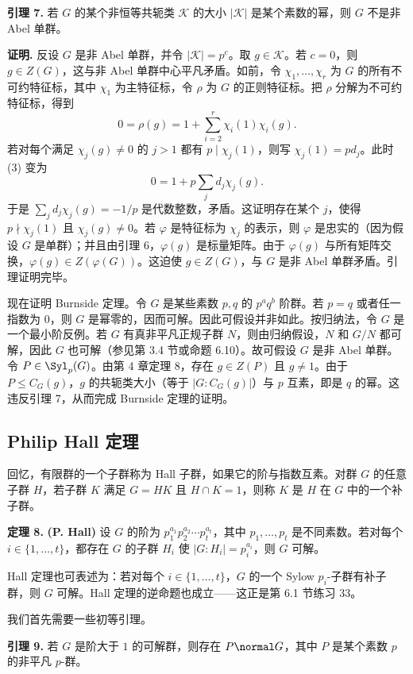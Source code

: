 \noindent\textbf{引理 7.} 若 $G$ 的某个非恒等共轭类 $\mathcal K$ 的大小 $|\mathcal K|$ 是某个素数的幂，则 $G$ 不是非 Abel 单群。

\noindent\textbf{证明.} 反设 $G$ 是非 Abel 单群，并令 $|\mathcal K|=p^c$。取 $g\in\mathcal K$。若 $c=0$，则 $g\in Z(G)$，这与非 Abel 单群中心平凡矛盾。如前，令 $\chi_1,\ldots,\chi_r$ 为 $G$ 的所有不可约特征标，其中 $\chi_1$ 为主特征标，令 $\rho$ 为 $G$ 的正则特征标。把 $\rho$ 分解为不可约特征标，得到
\[
  0=\rho(g)=1+\sum_{i=2}^r \chi_i(1)\chi_i(g). \tag{19.3}
\]
若对每个满足 $\chi_j(g)\neq0$ 的 $j>1$ 都有 $p\mid\chi_j(1)$，则写 $\chi_j(1)=pd_j$。此时 (3) 变为
\[
  0=1+p\sum_j d_j\chi_j(g).
\]
于是 $\sum_j d_j\chi_j(g)=-1/p$ 是代数整数，矛盾。这证明存在某个 $j$，使得 $p\nmid\chi_j(1)$ 且 $\chi_j(g)\neq0$。若 $\varphi$ 是特征标为 $\chi_j$ 的表示，则 $\varphi$ 是忠实的（因为假设 $G$ 是单群）；并且由引理 6，$\varphi(g)$ 是标量矩阵。由于 $\varphi(g)$ 与所有矩阵交换，$\varphi(g)\in Z(\varphi(G))$。这迫使 $g\in Z(G)$，与 $G$ 是非 Abel 单群矛盾。引理证明完毕。

现在证明 Burnside 定理。令 $G$ 是某些素数 $p,q$ 的 $p^a q^b$ 阶群。若 $p=q$ 或者任一指数为 $0$，则 $G$ 是幂零的，因而可解。因此可假设并非如此。按归纳法，令 $G$ 是一个最小阶反例。若 $G$ 有真非平凡正规子群 $N$，则由归纳假设，$N$ 和 $G/N$ 都可解，因此 $G$ 也可解（参见第 3.4 节或命题 6.10）。故可假设 $G$ 是非 Abel 单群。令 $P\in\Syl_p(G)$。由第 4 章定理 8，存在 $g\in Z(P)$ 且 $g\neq1$。由于 $P\leq C_G(g)$，$g$ 的共轭类大小（等于 $|G:C_G(g)|$）与 $p$ 互素，即是 $q$ 的幂。这违反引理 7，从而完成 Burnside 定理的证明。

\subsection*{Philip Hall 定理}

回忆，有限群的一个子群称为 Hall 子群，如果它的阶与指数互素。对群 $G$ 的任意子群 $H$，若子群 $K$ 满足 $G=HK$ 且 $H\cap K=1$，则称 $K$ 是 $H$ 在 $G$ 中的一个补子群。

\noindent\textbf{定理 8.} \textbf{(P. Hall)} 设 $G$ 的阶为 $p_1^{a_1}p_2^{a_2}\cdots p_t^{a_t}$，其中 $p_1,\ldots,p_t$ 是不同素数。若对每个 $i\in\{1,\ldots,t\}$，都存在 $G$ 的子群 $H_i$ 使 $|G:H_i|=p_i^{a_i}$，则 $G$ 可解。

Hall 定理也可表述为：若对每个 $i\in\{1,\ldots,t\}$，$G$ 的一个 Sylow $p_i$-子群有补子群，则 $G$ 可解。Hall 定理的逆命题也成立——这正是第 6.1 节练习 33。

我们首先需要一些初等引理。

\noindent\textbf{引理 9.} 若 $G$ 是阶大于 $1$ 的可解群，则存在 $P\normal G$，其中 $P$ 是某个素数 $p$ 的非平凡 $p$-群。

